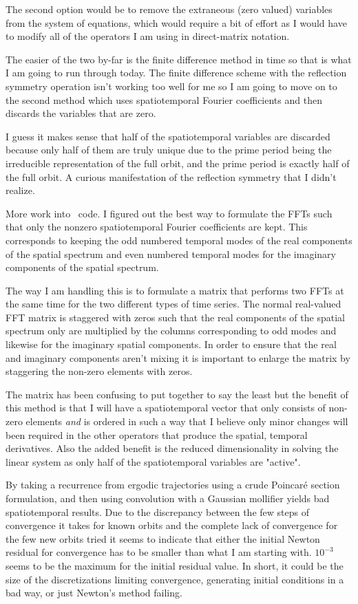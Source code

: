 The second option would be to remove the extraneous (zero valued) variables
from the system of equations, which would require a bit of effort as
I would have to modify all of the operators I am using in direct-matrix
notation.

The easier of the two by-far is the finite difference method in time so that
is what I am going to run through today.
The finite difference scheme with the reflection symmetry operation isn't
working too well for me so I am going to move on to the second method
which uses spatiotemporal Fourier coefficients and then discards the variables
that are zero.

I guess it makes sense that half of the spatiotemporal variables are discarded
because only half of them are truly unique due to the prime period being
the irreducible representation of the full orbit, and the prime period is
exactly half of the full orbit. A curious manifestation of the reflection
symmetry that I didn't realize.

More work into \ppo\ code. I figured out the best way to formulate the
FFTs such that only the nonzero spatiotemporal Fourier coefficients
are kept. This corresponds to keeping the odd numbered temporal modes
of the real components of the spatial spectrum and even numbered temporal
modes for the imaginary components of the spatial spectrum.

The way I am handling this is to formulate a matrix that performs two
FFTs at the same time for the two different types of time series. The
normal real-valued FFT matrix is staggered with zeros such that the
real components of the spatial spectrum only are multiplied by the
columns corresponding to odd modes and likewise for the imaginary spatial
components. In order to ensure that the real and imaginary components aren't
mixing it is important to enlarge the matrix by staggering the non-zero elements
with zeros.

The matrix has been confusing to put together to say the least but the benefit
of this method is that I will have a spatiotemporal vector that only consists
of non-zero elements \emph{and} is ordered in such a way that I believe only
minor changes will been required in the other operators that produce the spatial,
temporal derivatives. Also the added benefit is the reduced dimensionality in
solving the linear system as only half of the spatiotemporal variables are
"active".

By taking a recurrence from ergodic trajectories using a crude Poincar\'e section
formulation, and then using convolution with a Gaussian mollifier yields bad
spatiotemporal results. Due to the discrepancy between the few steps of convergence
it takes for known orbits and the complete lack of convergence for the few new orbits
tried it seems to indicate that either the initial Newton residual for convergence has
to be smaller than what I am starting with. $10^{-3}$ seems to be the maximum
for the initial residual value.
In short, it could be the size of the discretizations limiting convergence, generating
initial conditions in a bad way, or just Newton's method failing.

